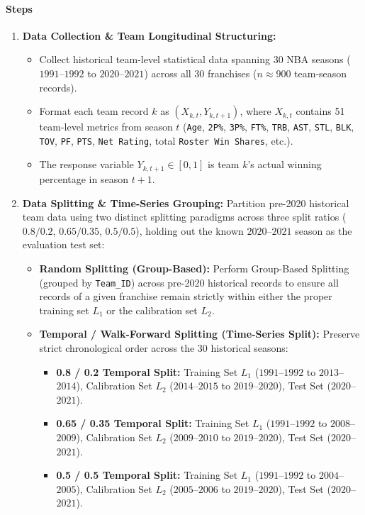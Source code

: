 \documentclass[11pt,a4paper]{article}
\begin{document}
\paragraph{Steps}
\begin{enumerate}
    \item \textbf{Data Collection \& Team Longitudinal Structuring:}
    \begin{itemize}
        \item Collect historical team-level statistical data spanning 30 NBA seasons ($1991$--$1992$ to $2020$--$2021$) across all 30 franchises ($n \approx 900$ team-season records).
        \item Format each team record $k$ as $(X_{k,t}, Y_{k,t+1})$, where $X_{k,t}$ contains 51 team-level metrics from season $t$ (\texttt{Age}, \texttt{2P\%}, \texttt{3P\%}, \texttt{FT\%}, \texttt{TRB}, \texttt{AST}, \texttt{STL}, \texttt{BLK}, \texttt{TOV}, \texttt{PF}, \texttt{PTS}, \texttt{Net Rating}, total \texttt{Roster Win Shares}, etc.).
        \item The response variable $Y_{k,t+1} \in [0, 1]$ is team $k$'s actual winning percentage in season $t+1$.
    \end{itemize}

    \item \textbf{Data Splitting \& Time-Series Grouping:}
    Partition pre-2020 historical team data using two distinct splitting paradigms across three split ratios ($0.8/0.2$, $0.65/0.35$, $0.5/0.5$), holding out the known $2020$--$2021$ season as the evaluation test set:
    \begin{itemize}
        \item \textbf{Random Splitting (Group-Based):} Perform Group-Based Splitting (grouped by \texttt{Team\_ID}) across pre-2020 historical records to ensure all records of a given franchise remain strictly within either the proper training set $L_1$ or the calibration set $L_2$.
        \item \textbf{Temporal / Walk-Forward Splitting (Time-Series Split):} Preserve strict chronological order across the 30 historical seasons:
        \begin{itemize}
            \item \textbf{0.8 / 0.2 Temporal Split:} Training Set $L_1$ ($1991$--$1992$ to $2013$--$2014$), Calibration Set $L_2$ ($2014$--$2015$ to $2019$--$2020$), Test Set ($2020$--$2021$).
            \item \textbf{0.65 / 0.35 Temporal Split:} Training Set $L_1$ ($1991$--$1992$ to $2008$--$2009$), Calibration Set $L_2$ ($2009$--$2010$ to $2019$--$2020$), Test Set ($2020$--$2021$).
            \item \textbf{0.5 / 0.5 Temporal Split:} Training Set $L_1$ ($1991$--$1992$ to $2004$--$2005$), Calibration Set $L_2$ ($2005$--$2006$ to $2019$--$2020$), Test Set ($2020$--$2021$).
        \end{itemize}
    \end{itemize}


\end{enumerate}
\end{document}
